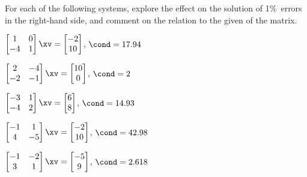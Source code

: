 \begin{exercise}  
For each of the following systems, explore the effect on the solution of 1\%~errors in the right-hand side, and comment on the relation to the given  of the matrix.

\begin{Parts}
\begin{reduce}
\item \(\begin{bmatrix} 1&0
\\-4&1 \end{bmatrix}\xv
=\begin{bmatrix} -2
\\10 \end{bmatrix}\), 
\(\cond=17.94\)
\end{reduce}

\item \(\begin{bmatrix} 2&-4
\\-2&-1 \end{bmatrix}\xv
=\begin{bmatrix} 10
\\0 \end{bmatrix}\), 
\(\cond=2\)

\item \(\begin{bmatrix} -3&1
\\-4&2 \end{bmatrix}\xv
=\begin{bmatrix} 6\\8 \end{bmatrix}\), 
\(\cond=14.93\)

\item \(\begin{bmatrix} -1&1
\\4&-5 \end{bmatrix}\xv
=\begin{bmatrix} -2
\\10 \end{bmatrix}\), 
\(\cond=42.98\)

\begin{reduce}
\item \(\begin{bmatrix} -1&-2
\\3&1 \end{bmatrix}\xv
=\begin{bmatrix} -5
\\9 \end{bmatrix}\), 
\(\cond=2.618\)
\end{reduce}

\end{Parts}
\end{exercise}



